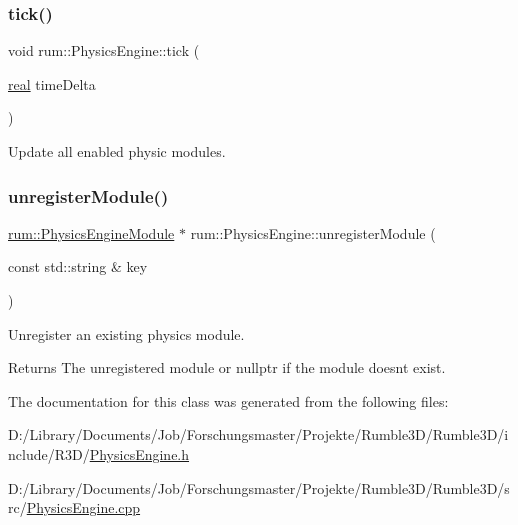 \subsubsection{\texorpdfstring{tick()}{tick()}}
{\footnotesize\ttfamily void rum\+::\+Physics\+Engine\+::tick (\begin{DoxyParamCaption}\item[{\mbox{\hyperlink{namespacerum_a7e8cca23573d5eaead0f138cbaa4862c}{real}}}]{time\+Delta }\end{DoxyParamCaption})}

Update all enabled physic modules. \mbox{\label{classrum_1_1_physics_engine_a3373c0c8052f75a2b6c584bceb96bd25}} 
\subsubsection{\texorpdfstring{unregister\+Module()}{unregisterModule()}}
{\footnotesize\ttfamily \mbox{\hyperlink{classrum_1_1_physics_engine_module}{rum\+::\+Physics\+Engine\+Module}} $\ast$ rum\+::\+Physics\+Engine\+::unregister\+Module (\begin{DoxyParamCaption}\item[{const std\+::string \&}]{key }\end{DoxyParamCaption})}

Unregister an existing physics module. \begin{DoxyReturn}{Returns}
The unregistered module or nullptr if the module doesn\textquotesingle{}t exist. 
\end{DoxyReturn}


The documentation for this class was generated from the following files\+:\begin{DoxyCompactItemize}
\item 
D\+:/\+Library/\+Documents/\+Job/\+Forschungsmaster/\+Projekte/\+Rumble3\+D/\+Rumble3\+D/include/\+R3\+D/\mbox{\hyperlink{_physics_engine_8h}{Physics\+Engine.\+h}}\item 
D\+:/\+Library/\+Documents/\+Job/\+Forschungsmaster/\+Projekte/\+Rumble3\+D/\+Rumble3\+D/src/\mbox{\hyperlink{_physics_engine_8cpp}{Physics\+Engine.\+cpp}}\end{DoxyCompactItemize}
